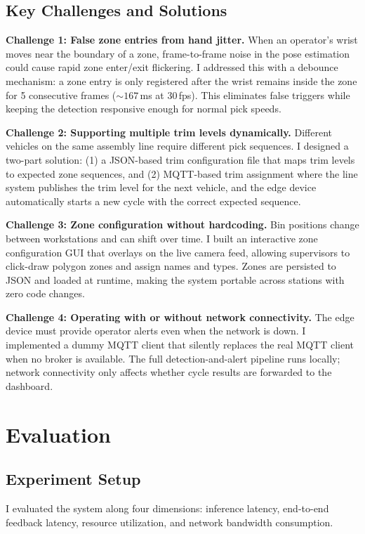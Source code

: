 \documentclass[conference]{IEEEtran}
\begin{document}
\subsection{Key Challenges and Solutions}

\textbf{Challenge 1: False zone entries from hand jitter.} When an operator's wrist moves near the boundary of a zone, frame-to-frame noise in the pose estimation could cause rapid zone enter/exit flickering. I addressed this with a debounce mechanism: a zone entry is only registered after the wrist remains inside the zone for 5 consecutive frames (${\sim}167$\,ms at 30\,fps). This eliminates false triggers while keeping the detection responsive enough for normal pick speeds.

\textbf{Challenge 2: Supporting multiple trim levels dynamically.} Different vehicles on the same assembly line require different pick sequences. I designed a two-part solution: (1) a JSON-based trim configuration file that maps trim levels to expected zone sequences, and (2) MQTT-based trim assignment where the line system publishes the trim level for the next vehicle, and the edge device automatically starts a new cycle with the correct expected sequence.

\textbf{Challenge 3: Zone configuration without hardcoding.} Bin positions change between workstations and can shift over time. I built an interactive zone configuration GUI that overlays on the live camera feed, allowing supervisors to click-draw polygon zones and assign names and types. Zones are persisted to JSON and loaded at runtime, making the system portable across stations with zero code changes.

\textbf{Challenge 4: Operating with or without network connectivity.} The edge device must provide operator alerts even when the network is down. I implemented a dummy MQTT client that silently replaces the real MQTT client when no broker is available. The full detection-and-alert pipeline runs locally; network connectivity only affects whether cycle results are forwarded to the dashboard.

\section{Evaluation}

\subsection{Experiment Setup}
I evaluated the system along four dimensions: inference latency, end-to-end feedback latency, resource utilization, and network bandwidth consumption.
\end{document}
